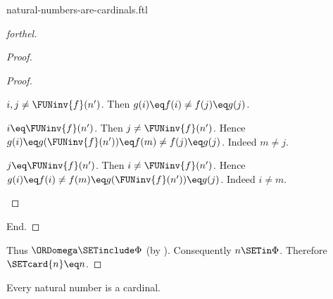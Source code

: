 \documentclass{stex}
\begin{document}
\begin{smodule}{natural-numbers-are-cardinals.ftl}
\begin{proof}[forthel]
\begin{proof}
\begin{proof}
        \begin{case}{$i, j \neq \FUNinv{f}(n')$.}
          Then $g(i)
            \eq f(i)
            \neq f(j)
            \eq g(j)$.
        \end{case}

        \begin{case}{$i \eq \FUNinv{f}(n')$.}
          Then $j \neq \FUNinv{f}(n')$.
          Hence $g(i)
            \eq g(\FUNinv{f}(n'))
            \eq f(m)
            \neq f(j)
            \eq g(j)$.
          Indeed $m \neq j$.
        \end{case}

        \begin{case}{$j \eq \FUNinv{f}(n')$.}
          Then $i \neq \FUNinv{f}(n')$.
          Hence $g(i)
            \eq f(i)
            \neq f(m)
            \eq g(\FUNinv{f}(n'))
            \eq g(j)$.
          Indeed $i \neq m$.
        \end{case}
      \end{proof}
    End.
  \end{proof}

  Thus $\ORDomega \SETinclude \Phi$ (by ).
  Consequently $n \SETin \Phi$.
  Therefore $\SETcard{n} \eq n$.
\end{proof}

\begin{corollary}[forthel,id=SET_THEORY_07_7061392098066432]
  Every natural number is a cardinal.
\end{corollary}
\end{smodule}
\end{document}
